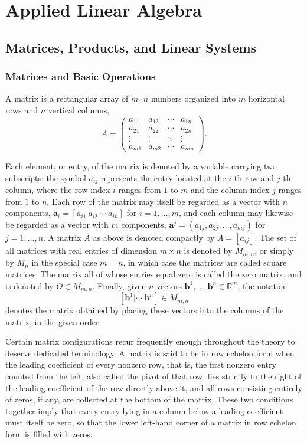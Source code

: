 \chapter{Applied Linear Algebra}

\section{Matrices, Products, and Linear Systems}

\subsection{Matrices and Basic Operations}


A matrix is a rectangular array of $m \cdot n$ numbers organized into $m$ horizontal rows and $n$ vertical columns,
\[
A =
\begin{pmatrix}
a_{11} & a_{12} & \cdots & a_{1n} \\
a_{21} & a_{22} & \cdots & a_{2n} \\
\vdots & \vdots & \ddots & \vdots \\
a_{m1} & a_{m2} & \cdots & a_{mn}
\end{pmatrix}.
\]

Each element, or entry, of the matrix is denoted by a variable carrying two subscripts: the symbol $a_{ij}$ represents the entry located at the $i$-th row and $j$-th column, where the row index $i$ ranges from $1$ to $m$ and the column index $j$ ranges from $1$ to $n$. Each row of the matrix may itself be regarded as a vector with $n$ components, $\mathbf{a}_i = [a_{i1} \ a_{i2} \ \cdots \ a_{in}]$ for $i = 1, \dots, m$, and each column may likewise be regarded as a vector with $m$ components, $\mathbf{a}^j = (a_{1j}, a_{2j}, \dots, a_{mj})$ for $j = 1, \dots, n$. A matrix $A$ as above is denoted compactly by $A = [a_{ij}]$. The set of all matrices with real entries of dimension $m \times n$ is denoted by $M_{m,n}$, or simply by $M_n$ in the special case $m = n$, in which case the matrices are called square matrices. The matrix all of whose entries equal zero is called the zero matrix, and is denoted by $O \in M_{m,n}$. Finally, given $n$ vectors $\mathbf{b}^1, \dots, \mathbf{b}^n \in \mathbb{R}^m$, the notation
\[
[\mathbf{b}^1 | \cdots | \mathbf{b}^n] \in M_{m,n}
\]
denotes the matrix obtained by placing these vectors into the columns of the matrix, in the given order.


Certain matrix configurations recur frequently enough throughout the theory to deserve dedicated terminology. A matrix is said to be in row echelon form when the leading coefficient of every nonzero row, that is, the first nonzero entry counted from the left, also called the pivot of that row, lies strictly to the right of the leading coefficient of the row directly above it, and all rows consisting entirely of zeros, if any, are collected at the bottom of the matrix. These two conditions together imply that every entry lying in a column below a leading coefficient must itself be zero, so that the lower left-hand corner of a matrix in row echelon form is filled with zeros.

